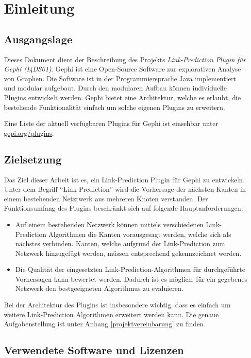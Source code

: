 \chapter{Einleitung}
\section{Ausgangslage}
Dieses Dokument dient der Beschreibung des Projekts \textit{Link-Prediction Plugin für Gephi (I4DS01)}.
Gephi ist eine Open-Source Software zur explorativen Analyse von Graphen. Die Software ist in der Programmiersprache Java implementiert und modular aufgebaut. Durch den modularen Aufbau können individuelle Plugins entwickelt werden. Gephi bietet eine Architektur, welche es erlaubt, die bestehende Funktionalität einfach um solche eigenen Plugins zu erweitern.

Eine Liste der aktuell verfügbaren Plugins für Gephi ist einsehbar unter \href{https://gephi.org/plugins}{gepi.org/plugins}.

\section{Zielsetzung}

Das Ziel dieser Arbeit ist es, ein Link-Prediction Plugin für Gephi zu entwickeln. Unter dem Begriff ``Link-Prediction'' wird die Vorhersage der nächsten Kanten in einem bestehenden Netztwerk aus mehreren Knoten verstanden.
Der Funktionsumfang des Plugins beschränkt sich auf folgende Hauptanforderungen:

\begin{itemize}
    \item Auf einem bestehenden Netzwerk können mittels verschiedenen Link-Prediction Algorithmen die Kanten vorausgesagt werden, welche sich als nächstes verbinden. Kanten, welche aufgrund der Link-Prediction zum Netzwerk hinzugefügt werden, müssen entsprechend gekennzeichnet werden.
    \item Die Qualität der eingesetzten Link-Prediction-Algorithmen für durchgeführte Vorhersagen kann bewertet werden. Dadurch ist es möglich, für ein gegebenes Netzwerk den bestgeeigneten Algorithmus zu evaluieren.
\end{itemize}

Bei der Architektur des Plugins ist insbesondere wichtig, dass es einfach um weitere Link-Prediction Algorithmen erweitert werden kann.
Die genaue Aufgabenstellung ist unter Anhang \ref{projektvereinbarung} zu finden.

\section{Verwendete Software und Lizenzen}

